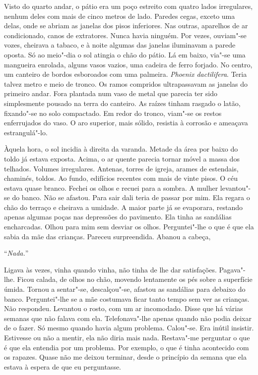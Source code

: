 Visto do quarto andar, o pátio era um poço estreito com quatro lados
irregulares, nenhum deles com mais de cinco metros de lado. Paredes
cegas, exceto uma delas, onde se abriam as janelas dos pisos
inferiores. Nas outras, aparelhos de ar condicionado, canos de
extratores. Nunca havia ninguém. Por vezes, ouviam"-se vozes, cheirava
a tabaco, e à noite algumas das janelas iluminavam a parede oposta. Só
ao meio"-dia o sol atingia o chão do pátio. Lá em baixo, via"-se uma
mangueira enrolada, alguns vasos vazios, uma cadeira de ferro forjado.
No centro, um canteiro de bordos esboroados com uma palmeira.
\emph{Phoenix dactilifera}. Teria talvez metro e meio de tronco. Os
ramos compridos ultrapassavam as janelas do primeiro andar. Fora
plantada num vaso de metal que parecia ter sido simplesmente pousado na
terra do canteiro. As raízes tinham rasgado o latão, fixando"-se no solo
compactado. Em redor do tronco, viam"-se os restos enferrujados do vaso.
O aro superior, mais sólido, resistia à corrosão e ameaçava
estrangulá"-lo.

Àquela hora, o sol incidia à direita da varanda. Metade da área por
baixo do toldo já estava exposta. Acima, o ar quente parecia tornar
móvel a massa dos telhados. Volumes irregulares. Antenas, torres de
igreja, arames de estendais, chaminés, toldos. Ao fundo, edifícios
recentes com mais de vinte pisos. O céu estava quase branco. Fechei os
olhos e recuei para a sombra. A mulher levantou"-se do banco. Não se
afastou. Para sair dali teria de passar por mim. Ela regara o chão do
terraço e cheirava a umidade. A maior parte já se evaporara, restando
apenas algumas poças nas depressões do pavimento. Ela tinha as sandálias
encharcadas. Olhou para mim sem desviar os olhos. Perguntei"-lhe o que é
que ela sabia da mãe das crianças. Pareceu surpreendida. Abanou a
cabeça,

``\emph{Nada.}''

Ligava às vezes, vinha quando vinha, não tinha de lhe dar satisfações.
Pagava"-lhe. Ficou calada, de olhos no chão, movendo lentamente os pés
sobre a superfície úmida. Tornou a sentar"-se, descalçou"-se, afastou
as sandálias para debaixo do banco. Perguntei"-lhe se a mãe costumava
ficar tanto tempo sem ver as crianças. Não respondeu. Levantou o rosto,
com um ar incomodado. Disse que há várias semanas que não falava com
ela. Telefonava"-lhe apenas quando não podia deixar de o fazer. Só mesmo
quando havia algum problema. Calou"-se. Era inútil insistir. Estivesse
ou não a mentir, ela não diria mais nada. Restava"-me perguntar o que é
que ela entendia por um problema. Por exemplo, o que é tinha acontecido
com os rapazes. Quase não me deixou terminar, desde o princípio da
semana que ela estava à espera de que eu perguntasse.

